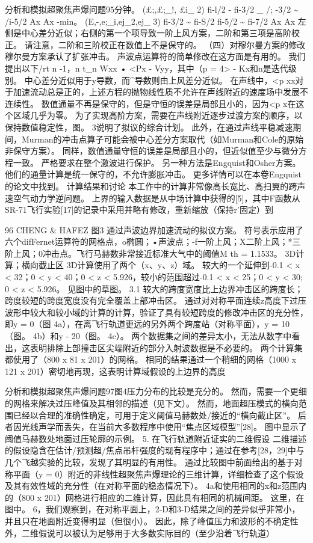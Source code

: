 \documentclass[UTF8,11pt,a4paper,openany,fontset=fandol]{ctexbook}
\begin{document}
分析和模拟超聚焦声爆问题95分钟。 (£;,£;\_!, £i\_ 2) fi-l/2 - fi-3/2 \_ /; -3/2 \textasciitilde{} /i-5/2 Ax Ax -min。 (E,-,e;\_i,ej\_2,ej\_ 3) fi-3/2 \textasciitilde{} fi-S/2 fi-5/2 \textasciitilde{} fi-7/2 Ax Ax 左侧是中心差分近似；右侧的第一个项导致一阶上风方案，二阶和第三项是高阶校正。 请注意，二阶和三阶校正在数值上不是保守的。 （四）对穆尔曼方案的修改 穆尔曼方案承认了扩张冲击。 声波点运算符的简单修改在这方面是有用的。 我们提出以下/rt n -1，n t\_n Wxx • <Px - Vyy，其中（p = 4> - Kx和n是迭代级别。 中心差分近似用于y导数，而\textasciicircum{}导数则由上风差分近似。 在声线中，<p xx对于加速流动总是正的，上述方程的抛物线性质不允许在声线附近的速度场中发展不连续性。 数值通量不再是保守的，但是守恒的误差是局部且小的，因为<p x在这个区域几乎为零。 为了实现高阶方案，需要在声线附近逐步过渡方案的顺序，以保持数值稳定性，图。 3说明了拟议的综合计划。 此外，在通过声线平稳减速期间，Murman的冲击点算子可能会被中心差分方案取代（如Murman和Cole的原始非保守方案）。 同样，数值通量守恒的误差是局部且小的，但近似值至少与微分方程一致。 严格要求在整个激波进行保护。 另一种方法是Engquist和Osher方案。 他们的通量计算是统一保守的，不允许膨胀冲击。 更多详情可以在本卷Engquist的论文中找到。 计算结果和讨论 本工作中的计算非常像高长宽比、高扫翼的跨声速空气动力学逆问题。 上界的输入数据是从中场计算中获得的[5]，其中F函数从SR-71飞行实验[17]的记录中采用并略有修改，重新缩放（保持r'固定）到

96 CHENG \& HAFEZ 图3 通过声波边界加速流动的拟议方案。 符号表示应用了六个difFernet运算符的网格点，o椭圆；•声波点；-f一阶上风；X二阶上风；*三阶上风；0冲击点。飞行马赫数非常接近标准大气中的阈值M th = 1.1533。 3D计算；横向截止区 3D计算使用了两个（x、y、z）域。 较大的一个延伸到-0.1 < x < 32；0 < y < 40；0 < z < 5.926，较小的范围超过-0.1 < x < 25；0 < y < 30; 0 < z < 5.926。 见图中的草图。 3.1 较大的跨度宽度比上边界冲击区的跨度长；跨度较短的跨度宽度没有完全覆盖上部冲击区。 通过对对称平面连续z高度下过压波形中较大和较小域的计算的计算，验证了具有较短跨度的修改冲击区的充分性，即y = 0（图 4a），在离飞行轨道更远的另外两个跨度站（对称平面），y = 10（图。 4b）和y - 20（图。 4c）。 两个数据集之间的差异太小，无法从数字中看出，这表明排除上部撞击区尖端附近的部分入射波数据是不必要的。 两个计算集都使用了（800 x 81 x 201）的网格。 相同的结果通过一个稍细的网格（1000 x 121 x 201）密切地再现，这表明计算域假设的上边界的高度

分析和模拟超聚焦声爆问题97图4压力分布的比较是充分的。 然而，需要一个更细的网格来解决过压峰值及其相邻的描述（见下文）。 然而，地面超压模式的横向范围已经以合理的准确性确定，可用于定义阈值马赫数处/接近的“横向截止区”。 后者因光线声学而丢失，在当前大多数程序中使用“焦点区域模型”[28]。 图中显示了阈值马赫数处地面过压轮廓的示例。 5. 在飞行轨道附近证实的二维假设 二维描述的假设隐含在估计/预测超/焦点吊杆强度的现有程序中；通过在参考[28，29]中与几个飞越实验的比较，发现了其明显的有用性。 通过比较图中前面给出的基于对称平面（y = 0）附近的非线性超聚焦声爆理论的三维计算，详细检查了这个假设及其有效性域的充分性（在对称平面的稳态情况下）。 4a和使用相同的x和z范围内的（800 x 201）网格进行相应的二维计算，因此具有相同的机械间距。 这里，在图中。 6，我们观察到，在对称平面上，2-D和3-D结果之间的差异似乎非常小，并且只在地面附近变得明显（但很小）。 因此，除了峰值压力和波形的不确定性外，二维假说可以被认为足够用于大多数实际目的（至少沿着飞行轨道）
\end{document}
